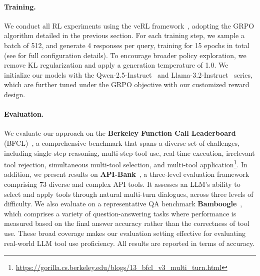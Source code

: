 \paragraph{Training.}  We conduct all RL experiments using the veRL framework~\citep{sheng2024hybridflow}, adopting the GRPO algorithm detailed in the previous section. For each training step, we sample a batch of 512, and generate 4 responses per query, training for 15 epochs in total (see  for full configuration details). To encourage broader policy exploration, we remove KL regularization and apply a generation temperature of 1.0. We initialize our models with the Qwen-2.5-Instruct~\citep{2024qwen2.5} and Llama-3.2-Instruct~\citep{dubey2024llama} series, which are further tuned under the GRPO objective with our customized reward design.

\paragraph{Evaluation.} We evaluate our approach on the \textbf{Berkeley Function Call Leaderboard} (BFCL)~\citep{patil2024gorilla}, a comprehensive benchmark that spans a diverse set of challenges, including single-step reasoning, multi-step tool use, real-time execution, irrelevant tool rejection, simultaneous multi-tool selection, and multi-tool application\footnote{\url{https://gorilla.cs.berkeley.edu/blogs/13_bfcl_v3_multi_turn.html}}. In addition, we present results on \textbf{API-Bank}~\citep{li2023api}, a three-level evaluation framework comprising 73 diverse and complex API tools. It assesses an LLM’s ability to select and apply tools through natural multi-turn dialogues, across three levels of difficulty. We also evaluate on a representative QA benchmark \textbf{Bamboogle}~\citep{press2022measuring}, which comprises a variety of question-answering tasks where performance is measured based on the final answer accuracy rather than the correctness of tool use. These broad coverage makes our evaluation setting effective for evaluating real-world LLM tool use proficiency. All results are reported in terms of accuracy.


